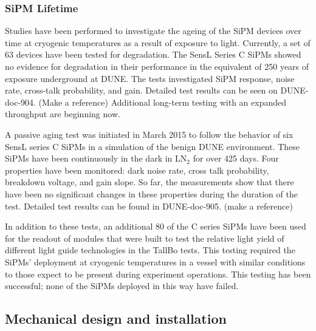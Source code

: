 \subsubsection{SiPM Lifetime}
Studies have been performed to investigate the ageing of the SiPM devices over time at 
cryogenic temperatures as a result of exposure to light.
Currently, a set of 63 devices have been tested for degradation.
The SensL Series C SiPMs showed no evidence for degradation in their 
performance in the equivalent of 250 years of exposure underground at DUNE. 
The tests investigated SiPM response, noise rate, cross-talk probability, and
gain.
Detailed test results can be seen on DUNE-doc-904. (Make a reference) 
Additional long-term testing with an expanded throughput are beginning
now.

A passive aging test was initiated in March 2015 to follow the
behavior of six SensL series C SiPMs in a simulation of the benign
DUNE environment. These SiPMs have been continuously in the
dark in LN$_2$ for over 425 days. Four properties have been monitored:
dark noise rate, cross talk probability, breakdown voltage, and gain
slope. So far, the measurements show that there
have been no significant changes in these properties during the
duration of the test.
Detailed test results can be found in DUNE-doc-905. (make a reference)



In addition to these tests, an additional 80 of the C series SiPMs have been used for the
readout of modules that were built to test the relative light yield of
different light guide technologies in the TallBo tests.  %
This testing 
required the SiPMs' deployment at cryogenic temperatures in a vessel with 
similar conditions to those expect to be present during experiment operations. 
This testing has been successful; none of the SiPMs deployed in this way have failed.

\subsection{Mechanical design and installation}

